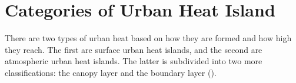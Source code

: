 \section{Categories of Urban Heat Island}

There are two types of urban heat based on how they are formed and how high they reach. 
The first are surface urban heat islands, and
the second are atmospheric urban heat islands.
The latter is subdivided into two more classifications:
the canopy layer and the boundary layer (\cite{Zhou2018}).